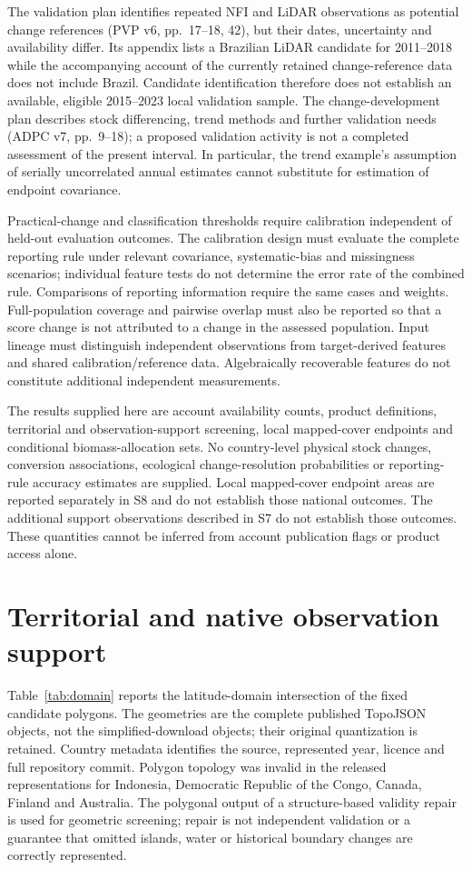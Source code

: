 \documentclass[11pt,a4paper]{article}
\begin{document}
The validation plan identifies repeated NFI and LiDAR observations as potential change references (PVP v6, pp.~17--18, 42), but their dates, uncertainty and availability differ. Its appendix lists a Brazilian LiDAR candidate for 2011--2018 while the accompanying account of the currently retained change-reference data does not include Brazil. Candidate identification therefore does not establish an available, eligible 2015--2023 local validation sample. The change-development plan describes stock differencing, trend methods and further validation needs (ADPC v7, pp.~9--18); a proposed validation activity is not a completed assessment of the present interval. In particular, the trend example's assumption of serially uncorrelated annual estimates cannot substitute for estimation of endpoint covariance.

Practical-change and classification thresholds require calibration independent of held-out evaluation outcomes. The calibration design must evaluate the complete reporting rule under relevant covariance, systematic-bias and missingness scenarios; individual feature tests do not determine the error rate of the combined rule. Comparisons of reporting information require the same cases and weights. Full-population coverage and pairwise overlap must also be reported so that a score change is not attributed to a change in the assessed population. Input lineage must distinguish independent observations from target-derived features and shared calibration/reference data. Algebraically recoverable features do not constitute additional independent measurements.

The results supplied here are account availability counts, product definitions, territorial and observation-support screening, local mapped-cover endpoints and conditional biomass-allocation sets. No country-level physical stock changes, conversion associations, ecological change-resolution probabilities or reporting-rule accuracy estimates are supplied. Local mapped-cover endpoint areas are reported separately in S8 and do not establish those national outcomes. The additional support observations described in S7 do not establish those outcomes. These quantities cannot be inferred from account publication flags or product access alone.

\section{Territorial and native observation support}

Table~\ref{tab:domain} reports the latitude-domain intersection of the fixed candidate polygons. The geometries are the complete published TopoJSON objects, not the simplified-download objects; their original quantization is retained. Country metadata identifies the source, represented year, licence and full repository commit. Polygon topology was invalid in the released representations for Indonesia, Democratic Republic of the Congo, Canada, Finland and Australia. The polygonal output of a structure-based validity repair is used for geometric screening; repair is not independent validation or a guarantee that omitted islands, water or historical boundary changes are correctly represented.
\end{document}
